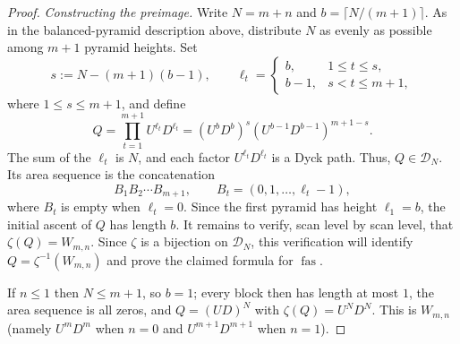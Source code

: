 \documentclass[11pt]{article}
\theoremstyle{definition}
\newcommand{\D}{\mathcal D}
\newcommand{\fas}{\operatorname{fas}}
\begin{document}
\begin{proof}
\emph{Constructing the preimage.}
Write $N=m+n$ and $b=\lceil N/(m+1)\rceil$.  As in the balanced-pyramid
description above, distribute $N$ as evenly as possible among $m+1$ pyramid
heights.  Set
\[
   s:=N-(m+1)(b-1),
   \qquad
   \ell_t=
   \begin{cases}
      b,   & 1\le t\le s,\\
      b-1, & s<t\le m+1,
   \end{cases}
\]
where $1\le s\le m+1$, and define
\[
   Q=\prod_{t=1}^{m+1}U^{\ell_t}D^{\ell_t}
    =(U^bD^b)^s(U^{b-1}D^{b-1})^{m+1-s}.
\]
The sum of the $\ell_t$ is $N$, and each factor
$U^{\ell_t}D^{\ell_t}$ is a Dyck path.  Thus, $Q\in\D_N$.  Its area sequence
is the concatenation
\[
   B_1B_2\cdots B_{m+1},\qquad B_t=(0,1,\ldots,\ell_t-1),
\]
where $B_t$ is empty when $\ell_t=0$.  Since the first pyramid has height
$\ell_1=b$, the initial ascent of $Q$ has length $b$.  It
remains to verify, scan level by scan level, that $\zeta(Q)=W_{m,n}$.  Since $\zeta$ is a
bijection on $\D_N$, this verification will identify
$Q=\zeta^{-1}(W_{m,n})$ and prove the claimed formula for $\fas$.

If $n\le 1$ then $N\le m+1$, so $b=1$; every block then has length at most $1$,
the area sequence is all zeros, and $Q=(UD)^N$ with $\zeta(Q)=U^ND^N$.  This is
$W_{m,n}$ (namely $U^mD^m$ when $n=0$ and $U^{m+1}D^{m+1}$ when $n=1$).


\end{proof}
\end{document}
